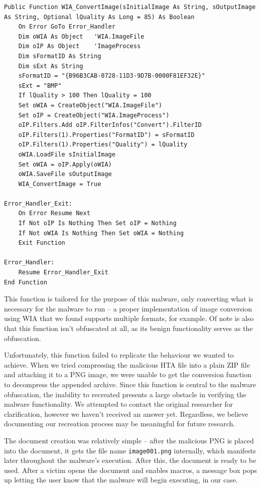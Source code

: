 \begin{lstlisting}[language=VBScript, caption={The image conversion function obtained from a source code dump.}]
Public Function WIA_ConvertImage(sInitialImage As String, sOutputImage As String, Optional lQuality As Long = 85) As Boolean
    On Error GoTo Error_Handler
    Dim oWIA As Object   'WIA.ImageFile
    Dim oIP As Object    'ImageProcess
    Dim sFormatID As String
    Dim sExt As String
    sFormatID = "{B96B3CAB-0728-11D3-9D7B-0000F81EF32E}"
    sExt = "BMP"
    If lQuality > 100 Then lQuality = 100
    Set oWIA = CreateObject("WIA.ImageFile")
    Set oIP = CreateObject("WIA.ImageProcess")
    oIP.Filters.Add oIP.FilterInfos("Convert").FilterID
    oIP.Filters(1).Properties("FormatID") = sFormatID
    oIP.Filters(1).Properties("Quality") = lQuality
    oWIA.LoadFile sInitialImage
    Set oWIA = oIP.Apply(oWIA)
    oWIA.SaveFile sOutputImage
    WIA_ConvertImage = True

Error_Handler_Exit:
    On Error Resume Next
    If Not oIP Is Nothing Then Set oIP = Nothing
    If Not oWIA Is Nothing Then Set oWIA = Nothing
    Exit Function

Error_Handler:
    Resume Error_Handler_Exit
End Function
\end{lstlisting}

This function is tailored for the purpose of this malware, only converting what is necessary for the malware to run -- 
a proper implementation of image conversion using \acrshort{WIA} that we found supports multiple formats, for example. 
Of note is also that this function isn't obfuscated at all, as its benign functionality serves as the obfuscation. 

Unfortunately, this function failed to replicate the behaviour we wanted to achieve. When we tried compressing the
malicious \acrfull{HTA} file into a plain ZIP file and attaching it to a \acrshort{PNG} image, we were unable to get the conversion
function to decompress the appended archive. Since this function is central to the malware obfuscation, the inability to
recreated presents a large obstacle in verifying the malware functionality. We attempted to contact the original
researcher for clarification, however we haven't received an answer yet.
Regardless, we believe documenting our recreation process may be meaningful for future research.

The document creation was relatively simple -- after the malicious \acrshort{PNG} is placed into the document, it gets
the file name \verb+image001.png+ internally, which manifests later throughout the malware's execution. After this, the
document is ready to be used. After a victim opens the document and enables macros, a message box pops up letting the
user know that the malware will begin executing, in our case.

